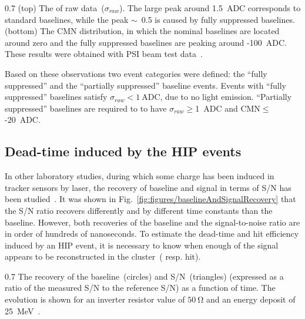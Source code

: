                  {0.7}       %
                 {(top) The \SD of raw data~($\sigma_{raw}$). The large peak around 1.5~ADC corresponds to standard baselines, while the peak $\sim$~0.5 is caused by fully suppressed baselines. (bottom) The CMN distribution, in which the nominal baselines are located around zero and the fully suppressed baselines are peaking around -100~ADC. These results were obtained with PSI beam test data~\cite{Bainbridge:2004jc}.} %

Based on these observations two event categories were defined: the ``fully suppressed'' and the ``partially suppressed'' baseline events. Events with ``fully suppressed'' baselines satisfy $\sigma_{raw}< 1~\mathrm{ADC}$, due to no light emission. ``Partially suppressed'' baselines are required to to have $\sigma_{raw}\geq$1~ADC and CMN$\leq$-20~ADC.

\subsection{Dead-time induced by the HIP events~\label{sec:deadtimePast}}

In other laboratory studies, during which some charge has been induced in tracker sensors by laser, the recovery of baseline and signal in terms of S/N has been studied~\cite{Adam:2005pz}. It was shown in Fig.~\ref{fig:figures/baselineAndSignalRecovery} that the S/N ratio recovers differently and by different time constants than the baseline. However, both recoveries of the baseline and the signal-to-noise ratio are in order of hundreds of nanoseconds. To estimate the dead-time and hit efficiency induced by an HIP event, it is necessary to know when enough of the signal appears to be reconstructed in the cluster~( resp. hit).

                 {0.7}       %
                 {The recovery of the baseline~(circles) and S/N~(triangles) (expressed as a ratio of the measured S/N to the reference S/N) as a function of time. The evolution is shown for an inverter resistor value of $50~\mathrm{\Omega}$ and an energy deposit of 25~MeV~\cite{Adam:2005pz}.} %

